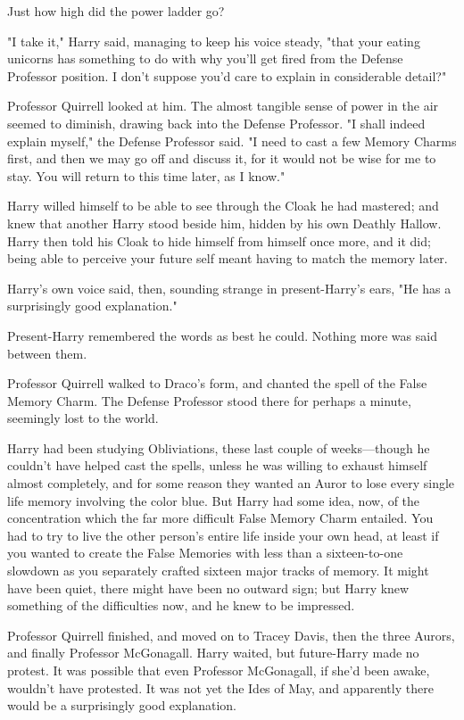 Just how high did the power ladder go?

"I take it," Harry said, managing to keep his voice steady, "that your eating unicorns has something to do with why you'll get fired from the Defense Professor position. I don't suppose you'd care to explain in considerable detail?"

Professor Quirrell looked at him. The almost tangible sense of power in the air seemed to diminish, drawing back into the Defense Professor. "I shall indeed explain myself," the Defense Professor said. "I need to cast a few Memory Charms first, and then we may go off and discuss it, for it would not be wise for me to stay. You will return to this time later, as I know."

Harry willed himself to be able to see through the Cloak he had mastered; and knew that another Harry stood beside him, hidden by his own Deathly Hallow. Harry then told his Cloak to hide himself from himself once more, and it did; being able to perceive your future self meant having to match the memory later.

Harry's own voice said, then, sounding strange in present-Harry's ears, "He has a surprisingly good explanation."

Present-Harry remembered the words as best he could. Nothing more was said between them.

Professor Quirrell walked to Draco's form, and chanted the spell of the False Memory Charm. The Defense Professor stood there for perhaps a minute, seemingly lost to the world.

Harry had been studying Obliviations, these last couple of weeks---though he couldn't have helped cast the spells, unless he was willing to exhaust himself almost completely, and for some reason they wanted an Auror to lose every single life memory involving the color blue. But Harry had some idea, now, of the concentration which the far more difficult False Memory Charm entailed. You had to try to live the other person's entire life inside your own head, at least if you wanted to create the False Memories with less than a sixteen-to-one slowdown as you separately crafted sixteen major tracks of memory. It might have been quiet, there might have been no outward sign; but Harry knew something of the difficulties now, and he knew to be impressed.

Professor Quirrell finished, and moved on to Tracey Davis, then the three Aurors, and finally Professor McGonagall. Harry waited, but future-Harry made no protest. It was possible that even Professor McGonagall, if she'd been awake, wouldn't have protested. It was not yet the Ides of May, and apparently there would be a surprisingly good explanation.

